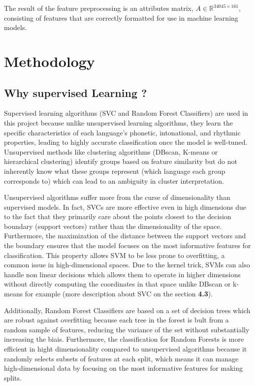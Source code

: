 \documentclass[twocolumn]{article}
\newcommand{\R}{\mathbb{R}}
\begin{document}
The result of the feature preprocessing is an attributes matrix, $A\in\R^{34045 \times 161}$, consisting of features that are correctly formatted for use in machine learning models. 

\section{Methodology}
\label{4}
\subsection{Why supervised Learning ?}
\label{4.1}
Supervised learning algorithms (SVC and Random Forest Classifiers) are used in this project because unlike unsupervised learning algorithms, they learn the specific characteristics of each language’s phonetic, intonational, and rhythmic properties, leading to highly accurate classification once the model is well-tuned. Unsupervised methods like clustering algorithms (DBscan, K-means or hierarchical clustering) identify groups based on feature similarity but do not inherently know what these groups represent (which language each group corresponds to) which can lead to an ambiguity in cluster interpretation.

Unsupervised algorithms suffer more from the curse of dimensionality than supervised models. In fact, SVCs are more effective even in high dimensions due to the fact that they primarily care about the points closest to the decision boundary (support vectors) rather than the dimensionality of the space. Furthermore, the maximization of the distance between the support vectors and the boundary ensures that the model focuses on the most informative features for classification. This property allows SVM to be less prone to overfitting, a common issue in high-dimensional spaces. Due to the kernel trick, SVMs can also handle non linear decisions which allows them to operate in higher dimensions without directly computing the coordinates in that space unlike DBscan or k-means for example (more description about SVC on the section \textbf{4.3}).

Additionally, Random Forest Classifiers are based on a set of decision trees which are robust against overfitting because each tree in the forest is bult from a random sample of features, reducing the variance of the set without substantially increasing the biais. Furthermore, the classification for Random Forests is more efficient in hight dimensionality compared to unsupervised algorithms because it randomly selects subsets of features at each split, which means it can manage high-dimensional data by focusing on the most informative features for making splits.
\end{document}
